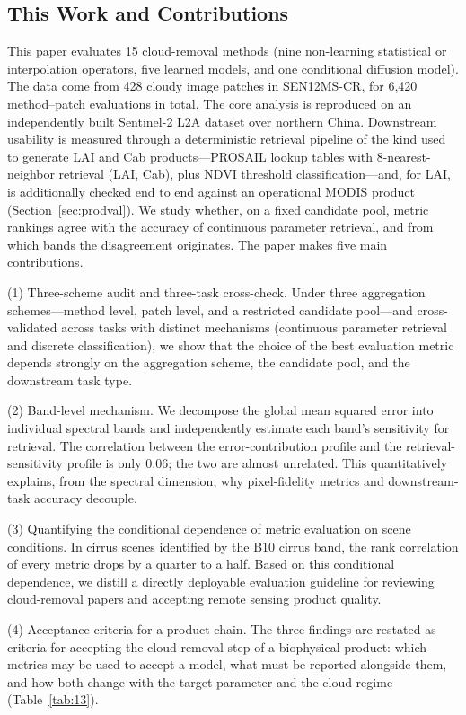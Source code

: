 \documentclass[a4paper,fleqn]{cas-dc}
\begin{document}
\subsection{This Work and Contributions}

This paper evaluates 15 cloud-removal methods (nine non-learning statistical or interpolation operators, five learned models, and one conditional diffusion model). The data come from 428 cloudy image patches in SEN12MS-CR, for 6,420 method--patch evaluations in total. The core analysis is reproduced on an independently built Sentinel-2 L2A dataset over northern China. Downstream usability is measured through a deterministic retrieval pipeline of the kind used to generate LAI and Cab products---PROSAIL lookup tables with 8-nearest-neighbor retrieval (LAI, Cab), plus NDVI threshold classification---and, for LAI, is additionally checked end to end against an operational MODIS product (Section~\ref{sec:prodval}). We study whether, on a fixed candidate pool, metric rankings agree with the accuracy of continuous parameter retrieval, and from which bands the disagreement originates. The paper makes five main contributions.

(1) Three-scheme audit and three-task cross-check. Under three aggregation schemes---method level, patch level, and a restricted candidate pool---and cross-validated across tasks with distinct mechanisms (continuous parameter retrieval and discrete classification), we show that the choice of the best evaluation metric depends strongly on the aggregation scheme, the candidate pool, and the downstream task type.

(2) Band-level mechanism. We decompose the global mean squared error into individual spectral bands and independently estimate each band's sensitivity for retrieval. The correlation between the error-contribution profile and the retrieval-sensitivity profile is only 0.06; the two are almost unrelated. This quantitatively explains, from the spectral dimension, why pixel-fidelity metrics and downstream-task accuracy decouple.

(3) Quantifying the conditional dependence of metric evaluation on scene conditions. In cirrus scenes identified by the B10 cirrus band, the rank correlation of every metric drops by a quarter to a half. Based on this conditional dependence, we distill a directly deployable evaluation guideline for reviewing cloud-removal papers and accepting remote sensing product quality.


(4) Acceptance criteria for a product chain. The three findings are restated as criteria for accepting the cloud-removal step of a biophysical product: which metrics may be used to accept a model, what must be reported alongside them, and how both change with the target parameter and the cloud regime (Table~\ref{tab:13}).
\end{document}
